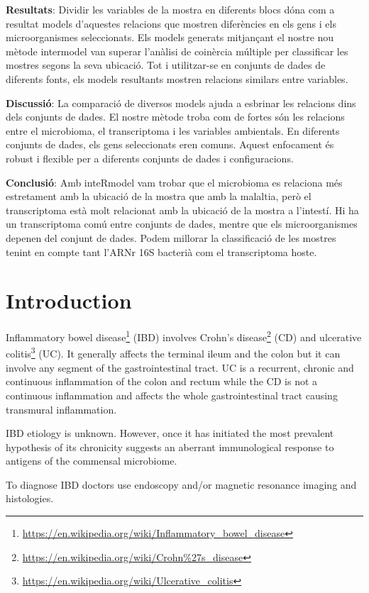 \documentclass[
  12pt,
  a4paper,
  twoside,
  openright]{book}
\DeclareRobustCommand{\href}[2]{#2\footnote{\url{#1}}}
\begin{document}
\textbf{Resultats}: Dividir les variables de la mostra en diferents blocs dóna com a resultat models d'aquestes relacions que mostren diferències en els gens i els microorganismes seleccionats.
Els models generats mitjançant el nostre nou mètode intermodel van superar l'anàlisi de coinèrcia múltiple per classificar les mostres segons la seva ubicació.
Tot i utilitzar-se en conjunts de dades de diferents fonts, els models resultants mostren relacions similars entre variables.

\textbf{Discussió}: La comparació de diversos models ajuda a esbrinar les relacions dins dels conjunts de dades.
El nostre mètode troba com de fortes són les relacions entre el microbioma, el transcriptoma i les variables ambientals.
En diferents conjunts de dades, els gens seleccionats eren comuns.
Aquest enfocament és robust i flexible per a diferents conjunts de dades i configuracions.

\textbf{Conclusió}: Amb inteRmodel vam trobar que el microbioma es relaciona més estretament amb la ubicació de la mostra que amb la malaltia, però el transcriptoma està molt relacionat amb la ubicació de la mostra a l'intestí.
Hi ha un transcriptoma comú entre conjunts de dades, mentre que els microorganismes depenen del conjunt de dades.
Podem millorar la classificació de les mostres tenint en compte tant l'ARNr 16S bacterià com el transcriptoma hoste.

\hypertarget{introduction}{%
\chapter{Introduction}\label{introduction}}

\href{https://en.wikipedia.org/wiki/Inflammatory_bowel_disease}{Inflammatory bowel disease} (IBD) involves \href{https://en.wikipedia.org/wiki/Crohn\%27s_disease}{Crohn's disease} (CD) and \href{https://en.wikipedia.org/wiki/Ulcerative_colitis}{ulcerative colitis} (UC).
It generally affects the terminal ileum and the colon but it can involve any segment of the gastrointestinal tract.
UC is a recurrent, chronic and continuous inflammation of the colon and rectum while the CD is not a continuous inflammation and affects the whole gastrointestinal tract causing transmural inflammation.

IBD etiology is unknown.
However, once it has initiated the most prevalent hypothesis of its chronicity suggests an aberrant immunological response to antigens of the commensal microbiome.

To diagnose IBD doctors use endoscopy and/or magnetic resonance imaging and histologies.
\end{document}
